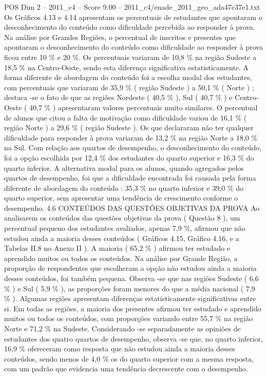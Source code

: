 \begin{textsample}{POS Dim 2 – 2011\_c4 – Score 9.00 – 2011\_c4/enade\_2011\_geo\_ada47c37e1.txt}
Os Gráficos 4.13 e 4.14 apresentam os percentuais de estudantes que apontaram o desconhecimento do conteúdo como dificuldade percebida ao responder à prova.
Na análise por Grandes Regiões, o percentual de inscritos e presentes que apontaram o desconhecimento do conteúdo como dificuldade ao responder à prova ficou entre 10 \% e 20 \%.
Os percentuais variaram de 10,8 \% na região Sudeste a 18,5 \% na Centro-Oeste, sendo esta diferença significativa estatisticamente.
A forma diferente de abordagem do conteúdo foi a escolha modal dos estudantes, com percentuais que variaram de 35,9 \% ( região Sudeste ) a 50,1 \% ( Norte ) ; destaca -se o fato de que as regiões Nordeste ( 40,5 \% ), Sul ( 40,7 \% ) e Centro-Oeste ( 40,7 \% ) apresentaram valores percentuais muito similares.
O percentual de alunos que citou a falta de motivação como dificuldade variou de 16,1 \% ( região Norte ) a 29,6 \% ( região Sudeste ).
Os que declararam não ter qualquer dificuldade para responder à prova variaram de 13,2 \% na região Norte a 18,0 \% na Sul.
Com relação aos quartos de desempenho, o desconhecimento do conteúdo, foi a opção escolhida por 12,4 \% dos estudantes do quarto superior e 16,3 \% do quarto inferior.
A alternativa modal para os alunos, quando agregados pelos quartos de desempenho, foi que a dificuldade encontrada foi causada pela forma diferente de abordagem do conteúdo : 35,3 \% no quarto inferior e 39,0 \% do quarto superior, sem apresentar uma tendência de crescimento conforme o desempenho. 4.6 CONTEÚDOS DAS QUESTÕES OBJETIVAS DA PROVA Ao analisarem os conteúdos das questões objetivas da prova ( Questão 8 ), um percentual pequeno dos estudantes avaliados, apenas 7,9 \%, afirmou que não estudou ainda a maioria desses conteúdos ( Gráficos 4.15, Gráfico 4.16, e a Tabelas II.8 no Anexo II ).
A maioria ( 65,2 \% ) afirmou ter estudado e aprendido muitos ou todos os conteúdos.
Na análise por Grande Região, a proporção de respondentes que escolheram a opção não estudou ainda a maioria desses conteúdos, foi também pequena.
Observa -se que nas regiões Sudeste ( 6,6 \% ) e Sul ( 5,9 \% ), as proporções foram menores do que a média nacional ( 7,9 \% ).
Algumas regiões apresentam diferenças estatisticamente significativas entre si.
Em todas as regiões, a maioria dos presentes afirmou ter estudado e aprendido muitos ou todos os conteúdos, com proporções variando entre 55,7 \% na região Norte e 71,2 \% na Sudeste.
Considerando -se separadamente as opiniões de estudantes dos quatro quartos de desempenho, observa -se que, no quarto inferior, 16,9 \% ofereceram como resposta que não estudou ainda a maioria desses conteúdos, sendo menos de 4,0 \% os do quarto superior com a mesma resposta, com um padrão que evidencia uma tendência decrescente com o desempenho.

\end{textsample}
